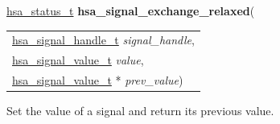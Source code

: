 \documentclass[final]{book}
\newcommand{\hsaarg}[1]{\textit{#1}}
\begin{document}
\noindent\begin{tcolorbox}[breakable,nobeforeafter,colframe=white,colback=lightgray,left=0mm]
\hyperlink{group__status_1gad755322e7ff95456520e8abdbe90d225}{hsa_status_t} \hypertarget{group__signals_1gae67f1205f49e846c1c919b0ed885b9c1}{\textbf{hsa_signal_exchange_relaxed}}(
\vspace{-3.5mm}\begin{longtable}{@{}p{\textwidth}}
\hspace{1.7em}\hyperlink{group__signals_1ga6592c136d70853d855bc11d9efdbf534}{hsa_signal_handle_t} \hsaarg{signal_handle},\\
\hspace{1.7em}\hyperlink{group__signals_1gacdf7a070a2f988bcf97904a1f5d0e573}{hsa_signal_value_t} \hsaarg{value},\\
\hspace{1.7em}\hyperlink{group__signals_1gacdf7a070a2f988bcf97904a1f5d0e573}{hsa_signal_value_t} * \hsaarg{prev_value})\end{longtable}

\end{tcolorbox}
Set the value of a signal and return its previous value.
\end{document}
